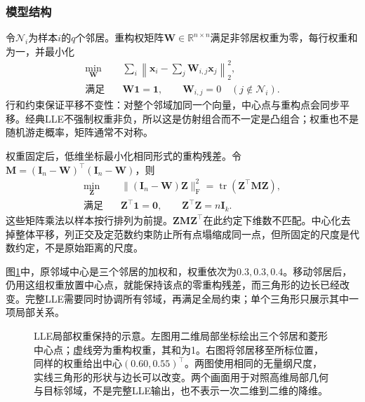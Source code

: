 \subsubsection{模型结构}

令$\mathcal{N}_i$为样本$i$的$q$个邻居。重构权矩阵$\bm{W}\in\mathbb{R}^{n\times n}$满足非邻居权重为零，每行权重和为一，并最小化
\begin{equation}
  \label{eq:dim-lle-weights}
  \begin{aligned}
    \min_{\bm{W}}\quad&
      \sum_i\left\lVert\bm{x}_i-\sum_j\bm{W}_{i,j}\bm{x}_j
      \right\rVert_2^2,\\
    \text{满足}\quad&
      \bm{W}\bm{1}=\bm{1},\qquad
      \bm{W}_{i,j}=0\quad(j\notin\mathcal{N}_i).
  \end{aligned}
\end{equation}
行和约束保证平移不变性：对整个邻域加同一个向量，中心点与重构点会同步平移。经典LLE不强制权重非负，所以这是仿射组合而不一定是凸组合；权重也不是随机游走概率，矩阵通常不对称。

权重固定后，低维坐标最小化相同形式的重构残差。令$\bm{M}=(\bm{I}_n-\bm{W})^{\top}(\bm{I}_n-\bm{W})$，则
\begin{equation}
  \label{eq:dim-lle-embedding}
  \begin{aligned}
    \min_{\bm{Z}}\quad&
      \lVert(\bm{I}_n-\bm{W})\bm{Z}\rVert_{\mathrm{F}}^2
      =\operatorname{tr}(\bm{Z}^{\top}\bm{M}\bm{Z}),\\
    \text{满足}\quad&
      \bm{Z}^{\top}\bm{1}=\bm{0},\qquad
      \bm{Z}^{\top}\bm{Z}=n\bm{I}_k.
  \end{aligned}
\end{equation}
这些矩阵乘法以样本按行排列为前提。$\bm{Z}\bm{M}\bm{Z}^{\top}$在此约定下维数不匹配。中心化去掉整体平移，列正交及定范数约束防止所有点塌缩成同一点，但所固定的尺度是代数约定，不是原始距离的尺度。

图\ref{fig:dim-lle-weights}中，原邻域中心是三个邻居的加权和，权重依次为$0.3,0.3,0.4$。移动邻居后，仍用这组权重放置中心点，就能保持该点的零重构残差，而三角形的边长已经改变。完整LLE需要同时协调所有邻域，再满足全局约束；单个三角形只展示其中一项局部关系。

\begin{figure}[htbp]
  \centering
  
  \caption{LLE局部权重保持的示意。左图用二维局部坐标绘出三个邻居和菱形中心点；虚线旁为重构权重，其和为1。右图将邻居移至所标位置，同样的权重给出中心$(0.60,0.55)^\top$。两图使用相同的无量纲尺度，实线三角形的形状与边长可以改变。两个画面用于对照高维局部几何与目标邻域，不是完整LLE输出，也不表示一次二维到二维的降维。}
  \label{fig:dim-lle-weights}
\end{figure}

